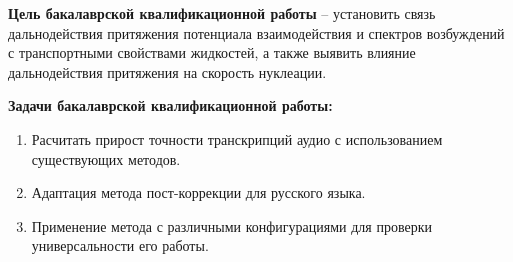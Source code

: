 


\newpage

\textbf{Цель бакалаврской квалификационной работы} -- установить связь \\ дальнодействия притяжения потенциала взаимодействия и спектров возбуждений с транспортными свойствами жидкостей, а также выявить влияние дальнодействия притяжения на скорость нуклеации.

\textbf{Задачи бакалаврской квалификационной работы:}
\begin{enumerate}
\item Расчитать прирост точности транскрипций аудио с использованием существующих методов. 
\item Адаптация метода пост-коррекции для русского языка.
\item Применение метода с различными конфигурациями для проверки универсальности его работы. 
\end{enumerate}


